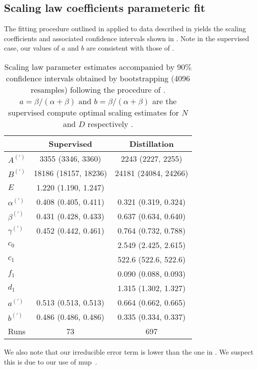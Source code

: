 \subsection{Scaling law coefficients parameteric fit}
\label{ssec:scaling-law-coefficients-parameteric-fit}

The fitting procedure outlined in 
applied to data described in 
yields the scaling coefficients and associated confidence intervals shown in 
.
Note in the supervised case, our values of $a$ and $b$ are consistent with those of 
\citet{DBLP:journals/corr/abs-2203-15556}.

\begin{table}[h]
\centering
{}
\caption{Scaling law parameter estimates accompanied by $90\%$ confidence intervals obtained by bootstrapping (4096 resamples) following the procedure of \citet{DBLP:journals/corr/abs-2404-10102}. $a=\beta/(\alpha+\beta)$ and $b=\beta/(\alpha+\beta)$ are the supervised  compute optimal scaling estimates for $N$ and $D$ respectively \citep{DBLP:journals/corr/abs-2203-15556}.}
\label{tab:scaling-law-parameter-estimates}
\begin{tabular}{lcc}
\toprule
 & Supervised & Distillation \\
\midrule
$A^{(\prime)}$ & 3355 (3346, 3360) & 2243 (2227, 2255) \\
$B^{(\prime)}$ & 18186 (18157, 18236) & 24181 (24084, 24266) \\
$E$ & 1.220 (1.190, 1.247) &  \\
$\alpha^{(\prime)}$ & 0.408 (0.405, 0.411) & 0.321 (0.319, 0.324) \\
$\beta^{(\prime)}$ & 0.431 (0.428, 0.433) & 0.637 (0.634, 0.640) \\
$\gamma^{(\prime)}$ & 0.452 (0.442, 0.461) & 0.764 (0.732, 0.788) \\
$c_0$ &  & 2.549 (2.425, 2.615) \\
$c_1$ &  & 522.6 (522.6, 522.6) \\
$f_1$ &  & 0.090 (0.088, 0.093) \\
$d_1$ &  & 1.315 (1.302, 1.327) \\
$a^{(\prime)}$ & 0.513 (0.513, 0.513) & 0.664 (0.662, 0.665) \\
$b^{(\prime)}$ & 0.486 (0.486, 0.486) & 0.335 (0.334, 0.337) \\
\midrule
Runs & 73 & 697 \\
\bottomrule
\end{tabular}
\end{table}

We also note that our irreducible error term is lower than the one in \citet{DBLP:journals/corr/abs-2203-15556}.
We suspect this is due to our use of \gls{mup}~\citep{DBLP:conf/icml/YangH21,DBLP:journals/corr/abs-2308-01814,DBLP:journals/corr/abs-2203-03466,DBLP:journals/corr/abs-2309-14322,DBLP:journals/corr/abs-2310-17813}.
